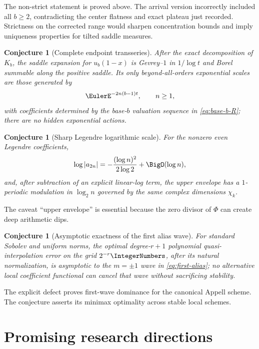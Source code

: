 \documentclass[11pt,oneside]{article}
\newtheorem{conjecture}[theorem]{Conjecture}
\theoremstyle{definition}
\theoremstyle{remark}
\begin{document}
The non-strict statement is proved above.  The arrival version incorrectly
included all \(b\geq2\), contradicting the center flatness and exact plateau
just recorded.  Strictness on the corrected range would sharpen concentration bounds and imply
uniqueness properties for tilted saddle measures.

\begin{conjecture}[Complete endpoint transseries]
\label{conj:resurgence}
After the exact decomposition of \(K_b\), the saddle expansion for
\(u_b(1-x)\) is Gevrey--\(1\) in \(1/\log t\) and Borel summable along the
positive saddle.  Its only beyond-all-orders exponential scales are those
generated by
\[
 \EulerE^{-2n(b-1)t},\qquad n\geq1,
\]
with coefficients determined by the base-\(b\) valuation sequence in
\eqref{eq:base-b-R}; there are no hidden exponential actions.
\end{conjecture}

\begin{conjecture}[Sharp Legendre logarithmic scale]
\label{conj:legendre-sharp}
For the nonzero even Legendre coefficients,
\[
 \log|a_{2n}|
 =-\frac{(\log n)^2}{2\log2}+\BigO(\log n),
\]
and, after subtraction of an explicit linear-log term, the upper envelope has
a \(1\)-periodic modulation in \(\log_2n\) governed by the same complex
dimensions \(\chi_k\).
\end{conjecture}

The caveat ``upper envelope'' is essential because the zero divisor of
\(\Phi\) can create deep arithmetic dips.

\begin{conjecture}[Asymptotic exactness of the first alias wave]
\label{conj:alias-norm}
For standard Sobolev and uniform norms, the optimal degree-\(r+1\)
polynomial quasi-interpolation error on the grid \(2^{-r}\IntegerNumbers\), after its
natural normalization, is asymptotic to the \(m=\pm1\) wave in
\eqref{eq:first-alias}; no alternative local coefficient functional can
cancel that wave without sacrificing stability.
\end{conjecture}

The explicit defect proves first-wave dominance for the canonical Appell
scheme.  The conjecture asserts its minimax optimality across stable local
schemes.

\section{Promising research directions}
\label{sec:future}
\end{document}
